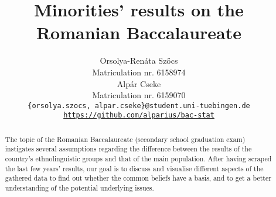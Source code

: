 \documentclass{article}
\title{Minorities' results on the Romanian Baccalaureate}
\author{%
  Orsolya-Renáta Szőcs\\
  Matriculation nr. 6158974\\
  \And
  Alpár Cseke\\
  Matriculation nr. 6159070\\
  \AND
  \texttt{\{orsolya.szocs, alpar.cseke\}@student.uni-tuebingen.de}\\
    \texttt{\href{https://github.com/alparius/bac-stat}{https://github.com/alparius/bac-stat}}\\
}
\begin{document}
\maketitle

\begin{abstract}
    The topic of the Romanian Baccalaureate (secondary school graduation exam) instigates several assumptions regarding the difference between the results of the country's ethnolinguistic groups and that of the main population. After having scraped the last few years' results, our goal is to discuss and visualise different aspects of the gathered data to find out whether the common beliefs have a basis, and to get a better understanding of the potential underlying issues.

\end{abstract}







\printbibliography
\end{document}
